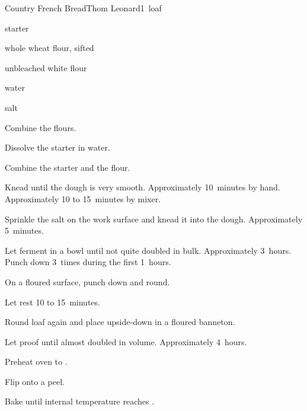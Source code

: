 \begin{recipe}{Country French Bread}{Thom Leonard}{1~loaf}

\begin{ingredients}
\item {} starter
\item {} whole wheat flour, sifted
\item {} unbleached white flour
\item {} 
\item {} water
\item {} salt
\end{ingredients}

\begin{directions}
\item Combine the flours.
\item Dissolve the starter in water.
\item Combine the starter and the flour.
\item Knead until the dough is very smooth. Approximately 10~minutes by hand. Approximately 10 to 15~minutes by mixer.
\item Sprinkle the salt on the work surface and knead it into the dough. Approximately 5~minutes.
\item Let ferment in a bowl until not quite doubled in bulk. Approximately 3~hours. Punch down 3~times during the first 1\half{}~hours.
\item On a floured surface, punch down and round.
\item Let rest 10 to 15~minutes.
\item Round loaf again and place upside-down in a floured banneton.
\item Let proof until almost doubled in volume. Approximately 4~hours.
\item Preheat oven to .
\item Flip onto a peel.
\item Bake until internal temperature reaches .
\end{directions}

\end{recipe}
